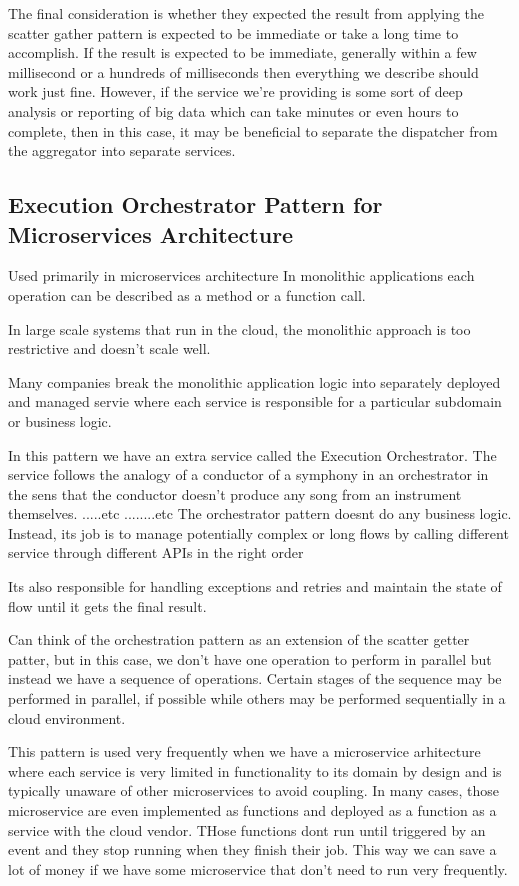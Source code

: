 \documentclass[a4paper, 11pt]{book}
\begin{document}
    The final consideration is whether they expected the result from applying the scatter gather pattern is expected to be immediate or take a long time to accomplish.
    If the result is expected to be immediate, generally within a few millisecond or a hundreds of milliseconds then everything we describe should work just fine.
    However, if the service we're providing is some sort of deep analysis or reporting of big data which can take minutes or even hours to complete, then in this case, it may be beneficial to separate the dispatcher from the aggregator into separate services.

    \subsection{Execution Orchestrator Pattern for Microservices Architecture}
    Used primarily in microservices architecture
    In monolithic applications each operation can be described as a method or a function call.

    In large scale systems that run in the cloud, the monolithic approach is too restrictive and doesn't scale well.

    Many companies break the monolithic application logic into separately deployed and managed servie where each service is responsible for a particular subdomain or business logic.

    In this pattern we have an extra service called the Execution Orchestrator.
    The service follows the analogy of a conductor of a symphony in an orchestrator in the sens that the conductor doesn't produce any song from an instrument themselves.
    .....etc ........etc
    The orchestrator pattern doesnt do any business logic.
    Instead, its job is to manage potentially complex or long flows by calling different service through different APIs in the right order

    Its also responsible for handling exceptions and retries and maintain the state of flow until it gets the final result.

    Can think of the orchestration pattern as an extension of the scatter getter patter, but in this case, we don't have one operation to perform in parallel but instead we have a sequence of operations.
    Certain stages of the sequence may be performed in parallel, if possible while others may be performed sequentially in a cloud environment.

    This pattern is used very frequently when we have a microservice arhitecture where each service is very limited in functionality to its domain by design and is typically unaware of other microservices to avoid coupling.
    In many cases, those microservice are even implemented as functions and deployed as a function as a service with the cloud vendor.
    THose functions dont run until triggered by an event and they stop running when they finish their job.
    This way we can save a lot of money if we have some microservice that don't need to run very frequently.
\end{document}

